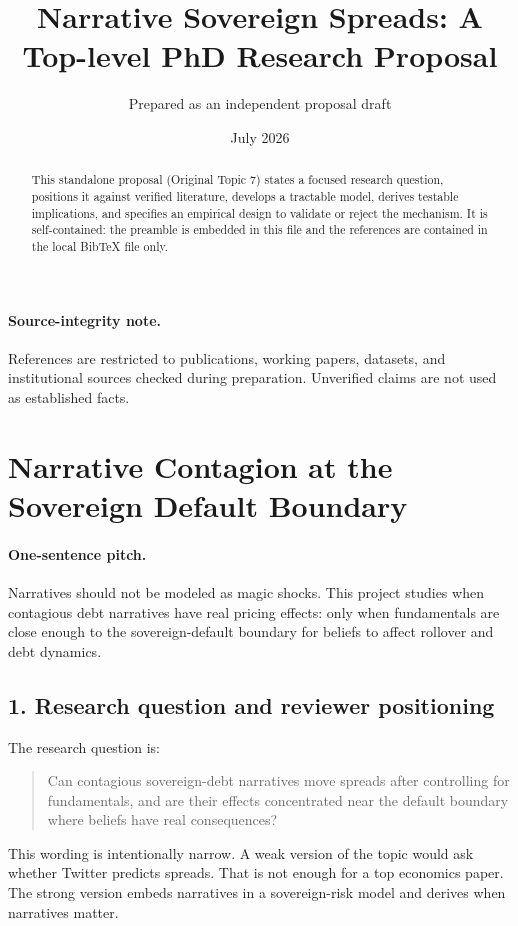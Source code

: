 \documentclass[11pt]{article}
\title{Narrative Sovereign Spreads: A Top-level PhD Research Proposal}
\author{Prepared as an independent proposal draft}
\date{July 2026}
\begin{document}
\maketitle
\begin{abstract}
This standalone proposal (Original Topic 7) states a focused research question, positions it against verified literature, develops a tractable model, derives testable implications, and specifies an empirical design to validate or reject the mechanism. It is self-contained: the preamble is embedded in this file and the references are contained in the local BibTeX file only.
\end{abstract}

\paragraph{Source-integrity note.} References are restricted to publications, working papers, datasets, and institutional sources checked during preparation. Unverified claims are not used as established facts.

\section{Narrative Contagion at the Sovereign Default Boundary}

\paragraph{One-sentence pitch.} Narratives should not be modeled as magic shocks. This project studies when contagious debt narratives have real pricing effects: only when fundamentals are close enough to the sovereign-default boundary for beliefs to affect rollover and debt dynamics.

\subsection*{1. Research question and reviewer positioning}
The research question is:
\begin{quote}
Can contagious sovereign-debt narratives move spreads after controlling for fundamentals, and are their effects concentrated near the default boundary where beliefs have real consequences?
\end{quote}
This wording is intentionally narrow. A weak version of the topic would ask whether Twitter predicts spreads. That is not enough for a top economics paper. The strong version embeds narratives in a sovereign-risk model and derives when narratives matter.
\end{document}
